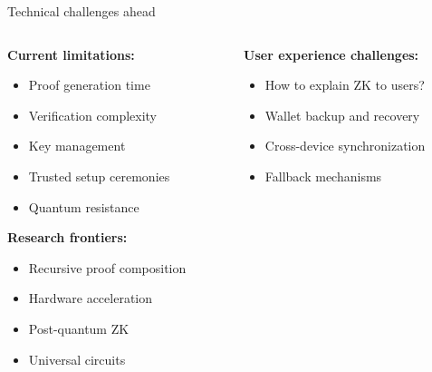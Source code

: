 \documentclass[aspectratio=169, lualatex, handout]{beamer}
\begin{document}
\begin{frame}{Technical challenges ahead}
	\begin{columns}[c]
		\begin{column}{0.5\textwidth}
			\textbf{Current limitations:}
			\begin{itemize}
				\item Proof generation time
				\item Verification complexity
				\item Key management
				\item Trusted setup ceremonies
				\item Quantum resistance
			\end{itemize}
			\vspace{0.5em}
			\textbf{Research frontiers:}
			\begin{itemize}
				\item Recursive proof composition
				\item Hardware acceleration
				\item Post-quantum ZK
				\item Universal circuits
			\end{itemize}
		\end{column}
		\begin{column}{0.5\textwidth}
			\textbf{User experience challenges:}
			\begin{itemize}
				\item How to explain ZK to users?
				\item Wallet backup and recovery
				\item Cross-device synchronization
				\item Fallback mechanisms
			\end{itemize}
		\end{column}
	\end{columns}
\end{frame}
\end{document}
